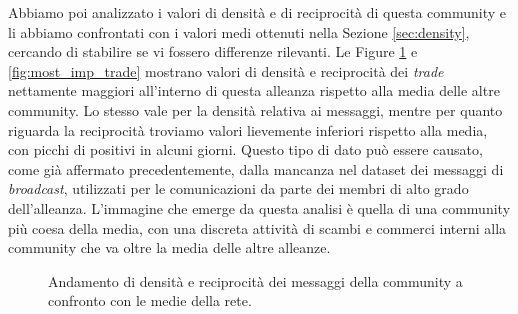 Abbiamo poi analizzato i valori di densità e di reciprocità di questa community e li abbiamo confrontati con i valori medi ottenuti nella Sezione \ref{sec:density}, cercando di stabilire se vi fossero differenze rilevanti. Le Figure \ref{fig:most_imp_mess} e \ref{fig:most_imp_trade} mostrano valori di densità e reciprocità dei \textit{trade} nettamente maggiori all'interno di questa alleanza rispetto alla media delle altre community. Lo stesso vale per la densità relativa ai messaggi, mentre per quanto riguarda la reciprocità troviamo valori lievemente inferiori rispetto alla media, con picchi di positivi in alcuni giorni. Questo tipo di dato può essere causato, come già affermato precedentemente, dalla mancanza nel dataset dei messaggi di \textit{broadcast}, utilizzati per le comunicazioni da parte dei membri di alto grado dell'alleanza. L'immagine che emerge da questa analisi è quella di una community più coesa della media, con una discreta attività di scambi e commerci interni alla community che va oltre la media delle altre alleanze.
\begin{figure}
	\hfill
	\caption{Andamento di densità e reciprocità dei messaggi della community a confronto con le medie della rete.}
	\label{fig:most_imp_mess}
\end{figure}
